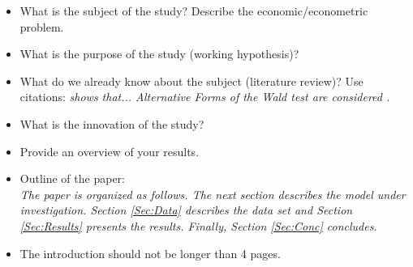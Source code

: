 \begin{itemize}

    \item What is the subject of the study? Describe the
        economic/econometric problem.

    \item What is the purpose of the study (working hypothesis)?

    \item What do we already know about the subject (literature
        review)? Use citations: {\it \cite{Gallant:87} shows that...
        Alternative Forms of the Wald test are considered
        \cite{Breusch&Schmidt:88}.}

    \item What is the innovation of the study?

    \item Provide an overview of your results.


    \item Outline of the paper:\\
        {\it The paper is organized as follows. The next section describes the
        model under investigation. Section \ref{Sec:Data} describes the data set
        and Section \ref{Sec:Results} presents the results. Finally, Section
        \ref{Sec:Conc} concludes.}

    \item The introduction should not be longer than 4 pages.

\end{itemize}
